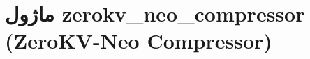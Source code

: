 \section{ماژول zerokv\_neo\_compressor (ZeroKV-Neo Compressor)}
\label{sec:module_zerokv_neo_compressor}
